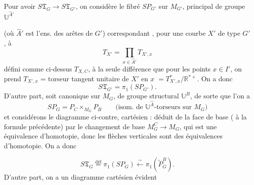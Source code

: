 \documentclass[11pt,a4paper]{article}
\begin{document}
Pour avoir $S\mathfrak{T}_G \to S\mathfrak{T}_{G'}$, on considère le fibré
$SP_{G'}$ sur $M_{G'}$, principal de groupe $\mathbb{U}^{\hat{A}'}$

(où $\hat{A}'$ est l'ens. des arêtes de $G'$) correspondant
, pour une courbe $X'$ de type $G'$, à
\struck{\ill{}} 
\[
T_{X'} = \prod_{x \in \hat{A}'} T_{X',x}
\]
défini comme ci-dessus $T_{X,C}$, à la seule différence que pour les points
$x \in I'$, on prend $T_{X',x}$ = torseur tangent unitaire de $X'$ en $x$
$= T^{*}_{X',x} / \mathbb{R}^{*+}$. On a donc
\[
S\mathfrak{T}_{G'} = \pi_1(SP_{G'}) .
\]
D'autre part, soit  
 canonique sur $M_G$, de groupe structural $\mathbb{U}^{B}$, de
sorte que l'on a
\[
SP_G = P_C \times_{M_G} P_B
\qquad \text{(isom. de $\mathbb{U}^{\hat{A}}$-torseurs sur $M_G$)}
\]
et considérons le diagramme ci-contre, cartésien :  \ill{}
déduit de la face de base ( à la formule précédente) par le
changement de base $M^C_G \to M_G$, qui est une équivalence d'homotopie,
donc  les flèches verticales sont des équivalences
d'homotopie. On a donc



\[
S\mathfrak{T}_G \overset{\text{déf}}{=} \pi_1(SP_G) \xleftarrow{\ \sim\ } \pi_1(\widetilde{P}^B_G) .
\]
D'autre part, on a un diagramme cartésien évident

\end{document}
